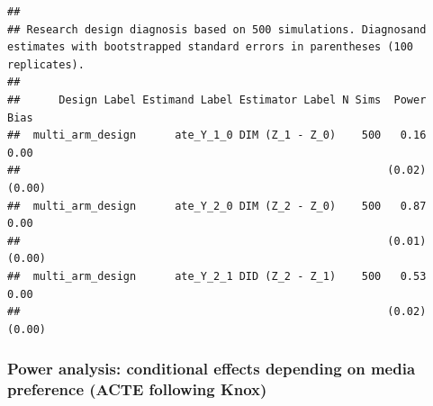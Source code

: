 \documentclass[]{article}
\begin{document}
\begin{verbatim}
## 
## Research design diagnosis based on 500 simulations. Diagnosand estimates with bootstrapped standard errors in parentheses (100 replicates).
## 
##      Design Label Estimand Label Estimator Label N Sims  Power   Bias
##  multi_arm_design      ate_Y_1_0 DIM (Z_1 - Z_0)    500   0.16   0.00
##                                                         (0.02) (0.00)
##  multi_arm_design      ate_Y_2_0 DIM (Z_2 - Z_0)    500   0.87   0.00
##                                                         (0.01) (0.00)
##  multi_arm_design      ate_Y_2_1 DID (Z_2 - Z_1)    500   0.53   0.00
##                                                         (0.02) (0.00)
\end{verbatim}

\hypertarget{power-analysis-conditional-effects-depending-on-media-preference-acte-following-knox}{%
\subsubsection{Power analysis: conditional effects depending on media
preference (ACTE following
Knox)}\label{power-analysis-conditional-effects-depending-on-media-preference-acte-following-knox}}
\end{document}
